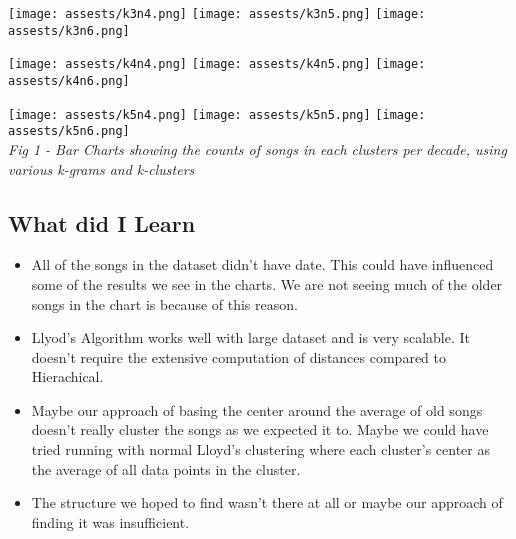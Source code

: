 \documentclass[12pt]{article}
\begin{document}
\begin{center}
\texttt{[image: assests/k3n4.png]}
\texttt{[image: assests/k3n5.png]}
\texttt{[image: assests/k3n6.png]}

\texttt{[image: assests/k4n4.png]}
\texttt{[image: assests/k4n5.png]}
\texttt{[image: assests/k4n6.png]}

\texttt{[image: assests/k5n4.png]}
\texttt{[image: assests/k5n5.png]}
\texttt{[image: assests/k5n6.png]} \\
\textit{Fig 1 - Bar Charts showing the counts of songs in each clusters per decade, using various k-grams and k-clusters}
\end{center}



\subsection*{What did I Learn}
\begin{itemize}
\item All of the songs in the dataset didn't have date. This could have influenced some of the results we see in the charts. We are not seeing much of the older songs in the chart is because of this reason.
\item Llyod's Algorithm works well with large dataset and is very scalable. It doesn't require the extensive computation of distances compared to Hierachical.
\item Maybe our approach of basing the center around the average of old songs doesn't really cluster the songs as we expected it to. Maybe we could have tried running with normal Lloyd's clustering  where each cluster's center as the average of all data points in the cluster.
\item The structure we hoped to find wasn't there at all or maybe our approach of finding it was insufficient.
\end{itemize}
\end{document}
